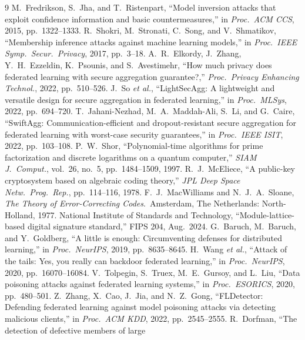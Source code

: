 \documentclass[lettersize,journal]{IEEEtran}
\begin{document}
\begin{thebibliography}{9}
 M.\ Fredrikson, S.\ Jha, and T.\ Ristenpart, ``Model
inversion attacks that exploit confidence information and basic countermeasures,''
in \emph{Proc.\ ACM CCS}, 2015, pp.\ 1322--1333.
 R.\ Shokri, M.\ Stronati, C.\ Song, and V.\ Shmatikov,
``Membership inference attacks against machine learning models,'' in
\emph{Proc.\ IEEE Symp.\ Secur.\ Privacy}, 2017, pp.\ 3--18.
 A.\ R.\ Elkordy, J.\ Zhang, Y.\ H.\ Ezzeldin, K.\ Psounis,
and S.\ Avestimehr, ``How much privacy does federated learning with secure
aggregation guarantee?,'' \emph{Proc.\ Privacy Enhancing Technol.}, 2022,
pp.\ 510--526.
 J.\ So \emph{et al.}, ``LightSecAgg: A lightweight and
versatile design for secure aggregation in federated learning,'' in
\emph{Proc.\ MLSys}, 2022, pp.\ 694--720.
 T.\ Jahani-Nezhad, M.\ A.\ Maddah-Ali, S.\ Li, and G.\ Caire,
``SwiftAgg: Communication-efficient and dropout-resistant secure aggregation for
federated learning with worst-case security guarantees,'' in \emph{Proc.\ IEEE
ISIT}, 2022, pp.\ 103--108.
 P.\ W.\ Shor, ``Polynomial-time algorithms for prime
factorization and discrete logarithms on a quantum computer,'' \emph{SIAM
J.\ Comput.}, vol.\ 26, no.\ 5, pp.\ 1484--1509, 1997.
 R.\ J.\ McEliece, ``A public-key cryptosystem based on
algebraic coding theory,'' \emph{JPL Deep Space Netw.\ Prog.\ Rep.}, pp.\ 114--116,
1978.
 F.\ J.\ MacWilliams and N.\ J.\ A.\ Sloane, \emph{The
Theory of Error-Correcting Codes}.\ Amsterdam, The Netherlands: North-Holland,
1977.
 National Institute of Standards and Technology,
``Module-lattice-based digital signature standard,'' FIPS 204, Aug.\ 2024.
 G.\ Baruch, M.\ Baruch, and Y.\ Goldberg, ``A little is
enough: Circumventing defenses for distributed learning,'' in \emph{Proc.\ NeurIPS},
2019, pp.\ 8635--8645.
 H.\ Wang \emph{et al.}, ``Attack of the tails: Yes, you
really can backdoor federated learning,'' in \emph{Proc.\ NeurIPS}, 2020,
pp.\ 16070--16084.
 V.\ Tolpegin, S.\ Truex, M.\ E.\ Gursoy, and L.\ Liu,
``Data poisoning attacks against federated learning systems,'' in \emph{Proc.\
ESORICS}, 2020, pp.\ 480--501.
 Z.\ Zhang, X.\ Cao, J.\ Jia, and N.\ Z.\ Gong,
``FLDetector: Defending federated learning against model poisoning attacks via
detecting malicious clients,'' in \emph{Proc.\ ACM KDD}, 2022, pp.\ 2545--2555.
\bibitem{dorfman1943} R.\ Dorfman, ``The detection of defective members of large

\end{thebibliography}
\end{document}
